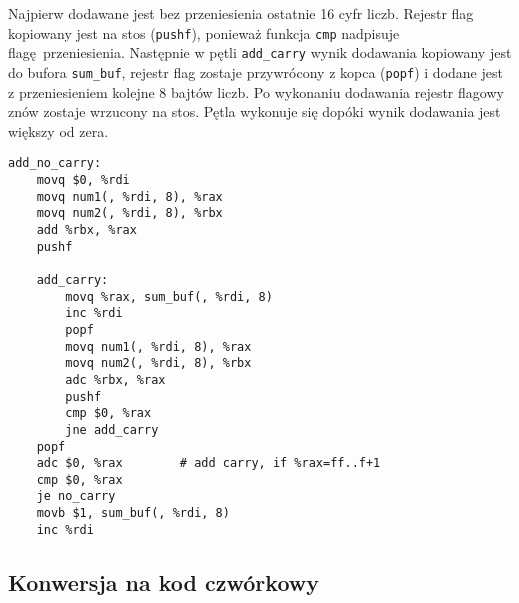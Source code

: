 \documentclass[polish, 11pt]{article}
\begin{document}
		\begin{minipage}{.4\textwidth}
			Najpierw dodawane jest bez przeniesienia ostatnie 16 cyfr liczb.
			Rejestr flag kopiowany jest na stos (\texttt{pushf}), ponieważ funkcja \texttt{cmp} nadpisuje flagę przeniesienia.
			Następnie w pętli \texttt{add\_carry} wynik dodawania kopiowany jest do bufora \texttt{sum\_buf}, rejestr flag zostaje przywrócony z kopca (\texttt{popf})
			i dodane jest z przeniesieniem kolejne 8 bajtów liczb.
			Po wykonaniu dodawania rejestr flagowy znów zostaje wrzucony na stos.
			Pętla wykonuje się dopóki wynik dodawania jest większy od zera.
		\end{minipage}%
		\hspace{1cm}
		\begin{minipage}{.5\textwidth}  %
			\begin{lstlisting}
add_no_carry:
	movq $0, %rdi
	movq num1(, %rdi, 8), %rax
	movq num2(, %rdi, 8), %rbx
	add %rbx, %rax
	pushf
	
	add_carry:
		movq %rax, sum_buf(, %rdi, 8)
		inc %rdi
		popf
		movq num1(, %rdi, 8), %rax
		movq num2(, %rdi, 8), %rbx
		adc %rbx, %rax
		pushf
		cmp $0, %rax
		jne add_carry
	popf
	adc $0, %rax        # add carry, if %rax=ff..f+1
	cmp $0, %rax
	je no_carry
	movb $1, sum_buf(, %rdi, 8)
	inc %rdi
			\end{lstlisting}  %
		\end{minipage}
	

	\subsection{Konwersja na kod czwórkowy}
\end{document}
